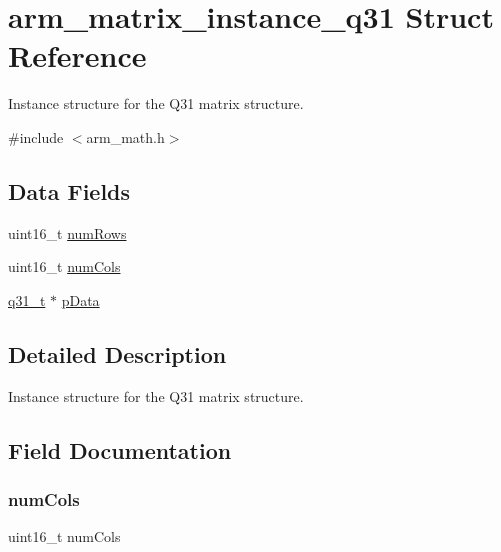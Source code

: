 \hypertarget{structarm__matrix__instance__q31}{}\section{arm\+\_\+matrix\+\_\+instance\+\_\+q31 Struct Reference}
\label{structarm__matrix__instance__q31}


Instance structure for the Q31 matrix structure.  




{\ttfamily \#include $<$arm\+\_\+math.\+h$>$}

\subsection*{Data Fields}
\begin{DoxyCompactItemize}
\item 
uint16\+\_\+t \mbox{\hyperlink{structarm__matrix__instance__q31_a1bcf80ccdc2acc29198f1592ae300390}{num\+Rows}}
\item 
uint16\+\_\+t \mbox{\hyperlink{structarm__matrix__instance__q31_a4bb5ec0d13eb4c9cf887aa8366a44117}{num\+Cols}}
\item 
\mbox{\hyperlink{arm__math_8h_adc89a3547f5324b7b3b95adec3806bc0}{q31\+\_\+t}} $\ast$ \mbox{\hyperlink{structarm__matrix__instance__q31_ad296f76577326ff280726323536eed6d}{p\+Data}}
\end{DoxyCompactItemize}


\subsection{Detailed Description}
Instance structure for the Q31 matrix structure. 

\subsection{Field Documentation}
\mbox{\label{structarm__matrix__instance__q31_a4bb5ec0d13eb4c9cf887aa8366a44117}} 
\subsubsection{\texorpdfstring{numCols}{numCols}}
{\footnotesize\ttfamily uint16\+\_\+t num\+Cols}

